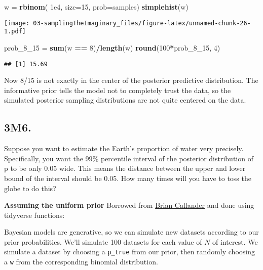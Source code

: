 \documentclass[
]{book}
\newenvironment{Shaded}{\begin{snugshade}}{\end{snugshade}}
\newcommand{\DataTypeTok}[1]{\textcolor[rgb]{0.13,0.29,0.53}{#1}}
\newcommand{\DecValTok}[1]{\textcolor[rgb]{0.00,0.00,0.81}{#1}}
\newcommand{\FloatTok}[1]{\textcolor[rgb]{0.00,0.00,0.81}{#1}}
\newcommand{\KeywordTok}[1]{\textcolor[rgb]{0.13,0.29,0.53}{\textbf{#1}}}
\newcommand{\NormalTok}[1]{#1}
\newcommand{\OperatorTok}[1]{\textcolor[rgb]{0.81,0.36,0.00}{\textbf{#1}}}
\newcommand{\StringTok}[1]{\textcolor[rgb]{0.31,0.60,0.02}{#1}}
\begin{document}
\begin{Shaded}
\begin{Highlighting}[]
\NormalTok{w =}\StringTok{ }\KeywordTok{rbinom}\NormalTok{( }\FloatTok{1e4}\NormalTok{, }\DataTypeTok{size=}\DecValTok{15}\NormalTok{, }\DataTypeTok{prob=}\NormalTok{samples)}
\KeywordTok{simplehist}\NormalTok{(w)}
\end{Highlighting}
\end{Shaded}

\texttt{[image: 03-samplingTheImaginary\_files/figure-latex/unnamed-chunk-26-1.pdf]}

\begin{Shaded}
\begin{Highlighting}[]
\NormalTok{prob_}\DecValTok{8}\NormalTok{_}\DecValTok{15}\NormalTok{ =}\StringTok{ }\KeywordTok{sum}\NormalTok{(w }\OperatorTok{==}\StringTok{ }\DecValTok{8}\NormalTok{)}\OperatorTok{/}\KeywordTok{length}\NormalTok{(w)}
\KeywordTok{round}\NormalTok{(}\DecValTok{100}\OperatorTok{*}\NormalTok{prob_}\DecValTok{8}\NormalTok{_}\DecValTok{15}\NormalTok{, }\DecValTok{4}\NormalTok{)}
\end{Highlighting}
\end{Shaded}

\begin{verbatim}
## [1] 15.69
\end{verbatim}

Now 8/15 is not exactly in the center of the posterior predictive distribution. The informative prior tells the model not to completely trust the data, so the simulated posterior sampling distributions are not quite centered on the data.

\hypertarget{m6.}{%
\subsection{3M6.}\label{m6.}}

Suppose you want to estimate the Earth's proportion of water very precisely. Specifically, you want the 99\% percentile interval of the posterior distribution of p to be only 0.05 wide. This means the distance between the upper and lower bound of the interval should be 0.05. How many times will you have to toss the globe to do this?

\textbf{Assuming the uniform prior}
Borrowed from \href{https://www.briancallander.com/posts/statistical-rethinking-2/exercise_3m}{Brian Callander} and done using tidyverse functions:

Bayesian models are generative, so we can simulate new datasets according to our prior probabilities. We'll simulate 100 datasets for each value of \(N\) of interest. We simulate a dataset by choosing a \texttt{p\_true} from our prior, then randomly choosing a \texttt{w} from the corresponding binomial distribution.
\end{document}
